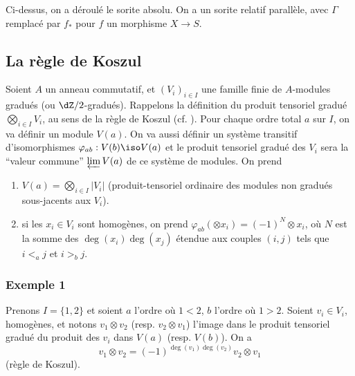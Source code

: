 \subsubsection{}\label{IV:1-2-6}

Ci-dessus, on a déroulé le sorite absolu. On a un sorite relatif 
parallèle, avec $\Gamma$ remplacé par $f_*$ pour $f$ un morphisme $X\to S$. 










\subsection{La règle de Koszul}\label{IV:1-3}

Soient $A$ un anneau commutatif, et $(V_i)_{i\in I}$ une famille finie de 
$A$-modules gradués (ou $\dZ/2$-gradués). Rappelons la définition du 
produit tensoriel gradué $\bigotimes_{i\in I} V_i$, au sens de la règle de 
Koszul (cf. \cite[XVII 1.1]{sga4}). Pour chaque ordre total $a$ sur $I$, on va 
définir un module $V(a)$. On va aussi définir un système transitif 
d'isomorphismes $\varphi_{a b}:V(b)\iso V(a)$ et le produit tensoriel 
gradué des $V_i$ sera la ``valeur commune'' $\varprojlim V(a)$ de ce 
système de modules. On prend 
\begin{enumerate}[\indent a)]
  \item $V(a) = \bigotimes_{i\in I} |V_i|$ (produit-tensoriel ordinaire des 
    modules non gradués sous-jacents aux $V_i$).
  \item si les $x_i\in V_i$ sont homogènes, on prend 
    $\varphi_{a b}(\otimes x_i) = (-1)^N \otimes x_i$, où $N$ est la somme 
    des $\deg(x_i)\deg(x_j)$ étendue aux couples $(i,j)$ tels que 
    $i<_a j$ et $i>_b j$.
\end{enumerate}





\subsubsection*{Exemple 1}

Prenons $I=\{1,2\}$ et soient $a$ l'ordre où $1<2$, $b$ l'ordre où $1>2$. 
Soient $v_i\in V_i$, homogènes, et notons $v_1\otimes v_2$ (resp. 
$v_2\otimes v_1$) l'image dans le produit tensoriel gradué du produit des 
$v_i$ dans $V(a)$ (resp. $V(b)$). On a 
\[
  v_1\otimes v_2 = (-1)^{\deg(v_1)\deg(v_2)} v_2\otimes v_1
\]
(règle de Koszul). 





